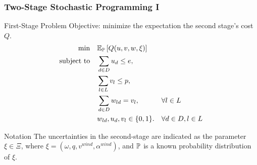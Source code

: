 \documentclass[aspectratio=169]{beamer}
\begin{document}
\begin{frame}
\frametitle{Two-Stage Stochastic Programming I}
\begin{alertblock}{First-Stage Problem}
\small
Objective: minimize the expectation the second stage's cost $Q$.
\scriptsize
\vspace{-3pt}
    \begin{subequations} \label{formulation:1stStage}
        \begin{align}
            \min \quad & \mathbb{E}_{\mathbb{P}} \left[ Q(u,v,w,\xi) \right] && \label{objective:1stStageObj} \\
            \operatorname{subject~to} \quad & \sum_{d \in D} u_d \leq e,     && \label{constraint:Num_Depot} \\
                             & \sum_{l \in L} v_l \leq p,     && \label{constraint:Num_Launch} \\
                             & \sum_{d \in D} w_{ld} = v_l,  && \forall l \in L \label{constraint:LaunchPointtoOneDepot} \\
                             & w_{ld}, u_d, v_l \in \{0,1\}. && \forall d \in D, l \in L \label{constraint:wBinary}
        \end{align}
    \end{subequations}
\end{alertblock}
\begin{block}{Notation}
    The uncertainties in the second-stage are indicated as the parameter $\xi \in \Xi$, where $\xi = \left( \omega, q , v^{wind} , \alpha^{wind} \right)$, and $\mathbb{P}$ is a known probability distribution of $\xi$.   
\end{block}
\end{frame}
\end{document}
